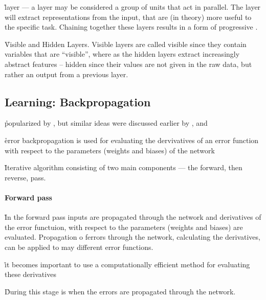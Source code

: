 \r{layer --- a layer may be considered a group of units that act in parallel. The layer will extract representations from the input, that are (in theory) more useful to the specific task.  Chaining together these layers results in a form of progressive .}

\r{Visible and Hidden Layers. Visible layers are called visible since they contain variables that are ``visible'', where as the hidden layers extract increasingly abstract features -- hidden since their values are not given in the raw data, but rather an output from a previous layer.}



\subsection{Learning: Backpropagation}


\r{popularized by , but similar ideas were discussed earlier by , and }

\r{error backpropagation is used for evaluating the dervivatives of an error function with respect to the parameters (weights and biases) of the network}

\r{Iterative algorithm consisting of two main components --- the forward, then reverse, pass.}



\paragraph{Forward pass}

\r{In the forward pass inputs are propagated through the network and derivatives of the error functuion, with respect to the parameters (weights and biases) are evaluated. Propagation o ferrors through the network, calculating the derivatives, can be applied to may different error functions.}

\r{it becomes important to use a computationally efficient method for evaluating these derivatives }

\r{During this stage is when the errors are propagated through the network.}

